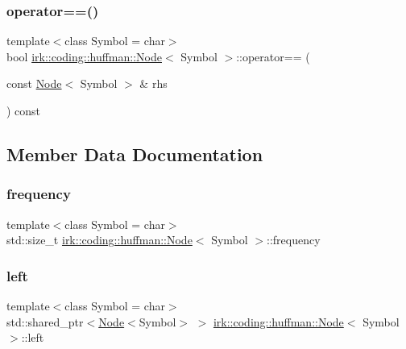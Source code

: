 \subsubsection{\texorpdfstring{operator==()}{operator==()}}
{\footnotesize\ttfamily template$<$class Symbol = char$>$ \\
bool \mbox{\hyperlink{structirk_1_1coding_1_1huffman_1_1Node}{irk\+::coding\+::huffman\+::\+Node}}$<$ Symbol $>$\+::operator== (\begin{DoxyParamCaption}\item[{const \mbox{\hyperlink{structirk_1_1coding_1_1huffman_1_1Node}{Node}}$<$ Symbol $>$ \&}]{rhs }\end{DoxyParamCaption}) const\hspace{0.3cm}{\ttfamily [inline]}}



\subsection{Member Data Documentation}
\mbox{\label{structirk_1_1coding_1_1huffman_1_1Node_abbc9796a3581cba0148db661d6b351bc}} 
\subsubsection{\texorpdfstring{frequency}{frequency}}
{\footnotesize\ttfamily template$<$class Symbol = char$>$ \\
std\+::size\+\_\+t \mbox{\hyperlink{structirk_1_1coding_1_1huffman_1_1Node}{irk\+::coding\+::huffman\+::\+Node}}$<$ Symbol $>$\+::frequency}

\mbox{\label{structirk_1_1coding_1_1huffman_1_1Node_ab592b42ea185f45b9077572ac9816251}} 
\subsubsection{\texorpdfstring{left}{left}}
{\footnotesize\ttfamily template$<$class Symbol = char$>$ \\
std\+::shared\+\_\+ptr$<$\mbox{\hyperlink{structirk_1_1coding_1_1huffman_1_1Node}{Node}}$<$Symbol$>$ $>$ \mbox{\hyperlink{structirk_1_1coding_1_1huffman_1_1Node}{irk\+::coding\+::huffman\+::\+Node}}$<$ Symbol $>$\+::left}

